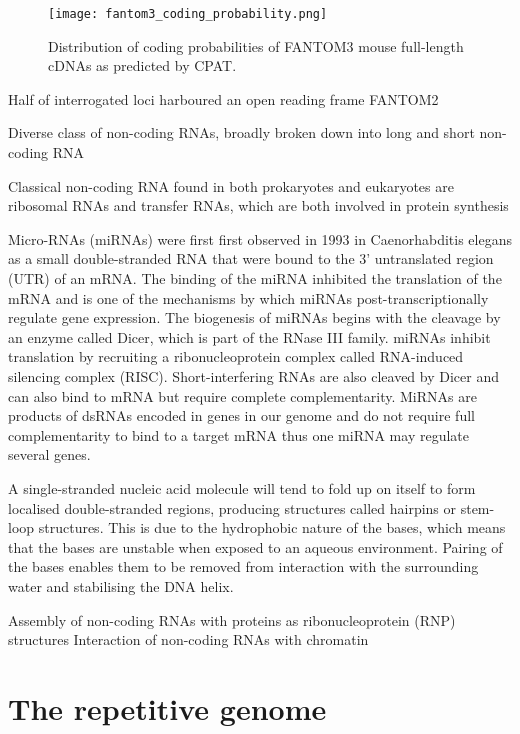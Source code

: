 \begin{figure}[!ht]
   \centering
   \texttt{[image: fantom3\_coding\_probability.png]}
   \caption[Coding probability of FANTOM3 mouse cDNAs]{Distribution of coding probabilities of FANTOM3 mouse full-length cDNAs as predicted by CPAT\cite{tang2014fantom3codingprob}.}
   \label{fig:fantom3_coding_prob}
\end{figure}

Half of interrogated loci harboured an open reading frame FANTOM2\cite{pmid12466851}

Diverse class of non-coding RNAs, broadly broken down into long and short non-coding RNA

Classical non-coding RNA found in both prokaryotes and eukaryotes are ribosomal RNAs and transfer RNAs, which are both involved in protein synthesis

Micro-RNAs (miRNAs) were first first observed in 1993 in Caenorhabditis elegans\cite{pmid8252621} as a small double-stranded RNA that were bound to the 3' untranslated region (UTR) of an mRNA. The binding of the miRNA inhibited the translation of the mRNA and is one of the mechanisms by which miRNAs post-transcriptionally regulate gene expression. The biogenesis of miRNAs begins with the cleavage by an enzyme called Dicer\cite{pmid11201747}, which is part of the RNase III family. miRNAs inhibit translation by recruiting a ribonucleoprotein complex called RNA-induced silencing complex (RISC). Short-interfering RNAs are also cleaved by Dicer and can also bind to mRNA but require complete complementarity. MiRNAs are products of dsRNAs encoded in genes in our genome and do not require full complementarity to bind to a target mRNA thus one miRNA may regulate several genes.

A single-stranded nucleic acid molecule will tend to fold up on itself to form localised double-stranded regions, producing structures called hairpins or stem-loop structures. This is due to the hydrophobic nature of the bases, which means that the bases are unstable when exposed to an aqueous environment. Pairing of the bases enables them to be removed from interaction with the surrounding water and stabilising the DNA helix.

Assembly of non-coding RNAs with proteins as ribonucleoprotein (RNP) structures
Interaction of non-coding RNAs with chromatin

\section{The repetitive genome}

